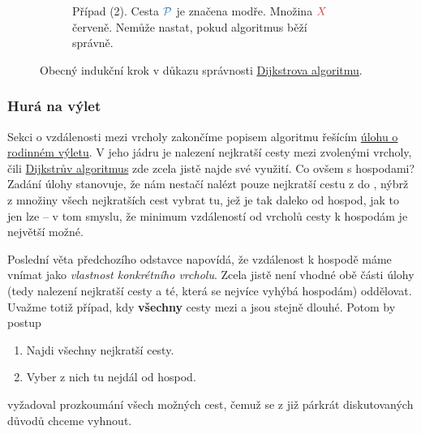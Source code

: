 \begin{figure}[h]
\begin{subfigure}{.47\textwidth}
  \caption{Případ (2). Cesta $\clb{\mathcal{P}}$ je značena modře. Množina
  $\clr{X}$ červeně. Nemůže nastat, pokud algoritmus běží správně.}
  \label{subfig:dukaz-dijkstra-pripad-2}
 \end{subfigure}
 \caption{Obecný indukční krok v důkazu správnosti
 \hyperref[alg:dijkstra]{Dijkstrova algoritmu}.}
 \label{fig:dukaz-dijkstra}
\end{figure}

\subsubsection{Hurá na výlet}
\label{sssec:hura-na-vylet}

Sekci o vzdálenosti mezi vrcholy zakončíme popisem algoritmu řešícím
\hyperref[prob:rodinny-vylet]{úlohu o rodinném výletu}. V jeho jádru je nalezení
nejkratší cesty mezi zvolenými vrcholy, čili \hyperref[alg:dijkstra]{Dijkstrův
algoritmus} zde zcela jistě najde své využití. Co ovšem s hospodami? Zadání
úlohy stanovuje, že nám nestačí nalézt pouze nejkratší cestu z  do
, nýbrž z množiny všech nejkratších cest vybrat tu, jež je tak
daleko od hospod, jak to jen lze -- v tom smyslu, že minimum vzdáleností od
vrcholů cesty k hospodám je největší možné.

Poslední věta předchozího odstavce napovídá, že vzdálenost k hospodě máme vnímat
jako \emph{vlastnost konkrétního vrcholu}. Zcela jistě není vhodné obě části
úlohy (tedy nalezení nejkratší cesty a té, která se nejvíce vyhýbá hospodám)
oddělovat. Uvažme totiž případ, kdy \textbf{všechny} cesty mezi  a
 jsou stejně dlouhé. Potom by postup
\begin{enumerate}
 \item Najdi všechny nejkratší cesty.
 \item Vyber z nich tu nejdál od hospod.
\end{enumerate}
vyžadoval prozkoumání všech možných cest, čemuž se z již párkrát diskutovaných
důvodů chceme vyhnout.

